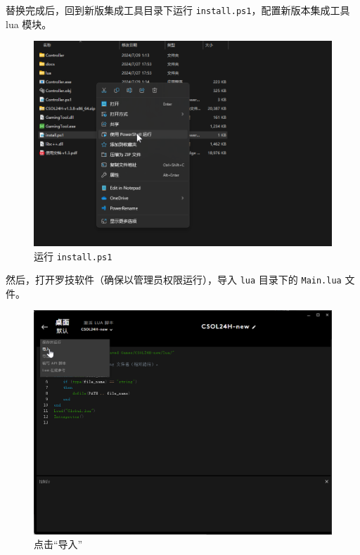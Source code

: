 替换完成后，回到新版集成工具目录下运行 \lstinline{install.ps1}，配置新版本集成工具 lua 模块。

\begin{figure}[H]
    \Centering
    \includegraphics[width=\textwidth]{docs/assets/update/run_install.png}
    \caption{运行 \lstinline{install.ps1}}
\end{figure}

然后，打开罗技软件（确保以管理员权限运行），导入 \lstinline{lua} 目录下的 \lstinline{Main.lua} 文件。

\begin{figure}[H]
    \Centering
    \includegraphics[width=\textwidth]{docs/assets/update/import_main_00.png}
    \caption{点击“导入”}
\end{figure}

